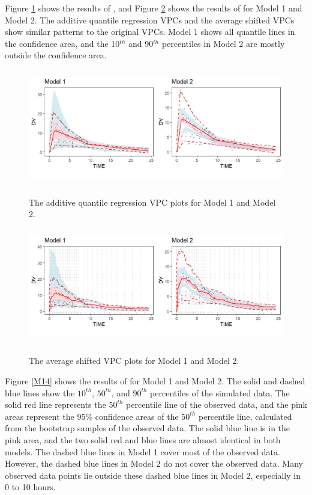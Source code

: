 Figure \ref{M12} shows the results of , and Figure \ref{M13} shows the results of  for Model 1 and Model 2. The additive quantile regression VPCs and the average shifted VPCs show similar patterns to the original VPCs. Model 1 shows all quantile lines in the confidence area, and the 10$^{th}$ and 90$^{th}$ percentiles in Model 2 are mostly outside the confidence area.

\begin{figure}
\caption{The additive quantile regression VPC plots for Model 1 and Model 2.}
\centering
\includegraphics[width=5in,height=2in]{plotPNG/M12-1.png}
\label{M12}
\end{figure}

\begin{figure}
\caption{The average shifted VPC plots for Model 1 and Model 2.}
\centering
\includegraphics[width=5in,height=2in]{plotPNG/M13-1.png}
\label{M13}
\end{figure}


Figure \ref{M14} shows the results of  for Model 1 and Model 2. The solid and dashed blue lines show the $10^{th}$, $50^{th}$, and $90^{th}$ percentiles of the simulated data. The solid red line represents the $50^{th}$ percentile line of the observed data, and the pink areas represent the 95\% confidence areas of the $50^{th}$ percentile line, calculated from the bootstrap samples of the observed data.
The solid blue line is in the pink area, and the two solid red and blue lines are almost identical in both models.
The dashed blue lines in Model 1 cover most of the observed data. However, the dashed blue lines in Model 2 do not cover the observed data. Many observed data points lie outside these dashed blue lines in Model 2, especially in 0 to 10 hours.

